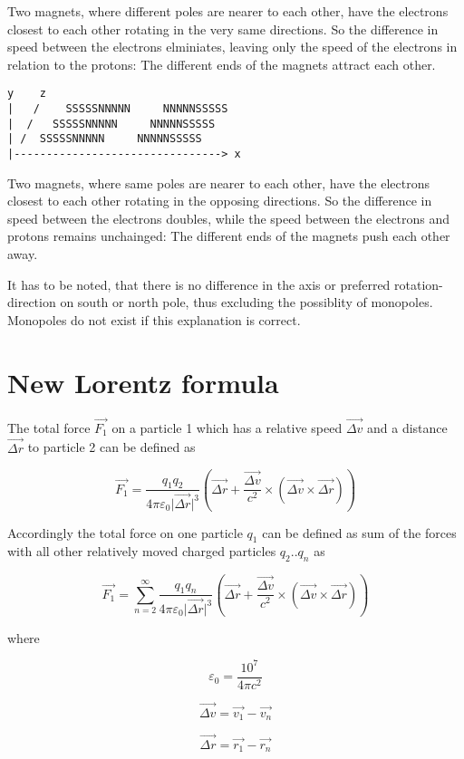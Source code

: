 \documentclass[12pt,a4paper,twocolumn]{article}
\begin{document}
Two magnets, where different poles are nearer to each other, have the electrons closest to each other rotating in the very same directions. So the difference in speed between the electrons elminiates, leaving only the speed of the electrons in relation to the protons: The different ends of the magnets attract each other.

\begin{verbatim}
y    z
|   /    SSSSSNNNNN     NNNNNSSSSS
|  /   SSSSSNNNNN     NNNNNSSSSS
| /  SSSSSNNNNN     NNNNNSSSSS
|--------------------------------> x
\end{verbatim}

Two magnets, where same poles are nearer to each other, have the electrons closest to each other rotating in the opposing directions. So the difference in speed between the electrons doubles, while the speed between the electrons and protons remains unchainged: The different ends of the magnets push each other away.

It has to be noted, that there is no difference in the axis or preferred rotation-direction on south or north pole, thus excluding the possiblity of monopoles. Monopoles do not exist if this explanation is correct.

\section{New Lorentz formula}

The total force $\vec{F_1}$ on a particle 1 which has a relative speed $\vec{\Delta v}$ and a distance $\vec{\Delta r}$ to particle 2 can be defined as 

$$\vec{F_1}= \frac{q_1 q_2}{4\pi\varepsilon_0 \vert \vec{\Delta r} \vert^3} ( \vec{\Delta r} + \frac{\vec{\Delta v}}{c^2} \times (\vec{\Delta v} \times \vec{\Delta r}))$$

Accordingly the total force on one particle $q_1$ can be defined as sum of the forces with all other relatively moved charged particles $q_2 .. q_n$ as 

$$\vec{F_1}= \sum_{n=2}^{\infty} \frac{q_1 q_n}{4\pi\varepsilon_0 \vert \vec{\Delta r} \vert^3} ( \vec{\Delta r} + \frac{\vec{\Delta v}}{c^2} \times (\vec{\Delta v} \times \vec{\Delta r}))$$

where

$$\varepsilon_0 = \frac{10^7}{4 \pi c^2}$$

$$\vec{\Delta v} = \vec{v_1} - \vec{v_n}$$

$$\vec{\Delta r} = \vec{r_1} - \vec{r_n}$$
\end{document}
